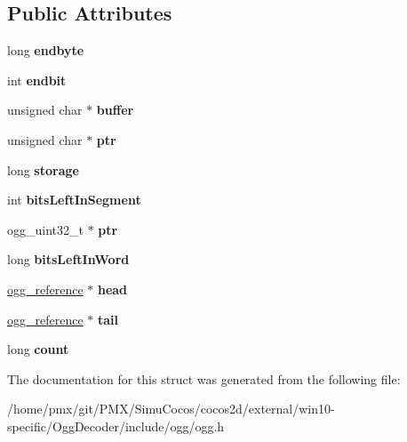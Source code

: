 \subsection*{Public Attributes}
\begin{DoxyCompactItemize}
\item 
\mbox{\label{structoggpack__buffer_a416200dd77da3603dce3913826d74207}} 
long {\bfseries endbyte}
\item 
\mbox{\label{structoggpack__buffer_a5a2ecb260025f73201e58dbd621c9f8b}} 
int {\bfseries endbit}
\item 
\mbox{\label{structoggpack__buffer_aea4c2d57891d2baf710d3ae6d0bf0d57}} 
unsigned char $\ast$ {\bfseries buffer}
\item 
\mbox{\label{structoggpack__buffer_aeea0f14b14eadc508b47e9da1dcc7a32}} 
unsigned char $\ast$ {\bfseries ptr}
\item 
\mbox{\label{structoggpack__buffer_a1eea2afb662c8080a902d224773fee4e}} 
long {\bfseries storage}
\item 
\mbox{\label{structoggpack__buffer_a5193645cd79e66468638a3a9a17a5a40}} 
int {\bfseries bits\+Left\+In\+Segment}
\item 
\mbox{\label{structoggpack__buffer_ae20355287b7df5d4acdd002449ff2baa}} 
ogg\+\_\+uint32\+\_\+t $\ast$ {\bfseries ptr}
\item 
\mbox{\label{structoggpack__buffer_af01c0101b21810a750b965a5b94bd67d}} 
long {\bfseries bits\+Left\+In\+Word}
\item 
\mbox{\label{structoggpack__buffer_ab64fb642435dc4b420259c6155076f54}} 
\hyperlink{structogg__reference}{ogg\+\_\+reference} $\ast$ {\bfseries head}
\item 
\mbox{\label{structoggpack__buffer_a196cfb63a42a9b7bdb1b779ee9bcc59e}} 
\hyperlink{structogg__reference}{ogg\+\_\+reference} $\ast$ {\bfseries tail}
\item 
\mbox{\label{structoggpack__buffer_a16703cfe279425bb2963ff3132b8ed9e}} 
long {\bfseries count}
\end{DoxyCompactItemize}


The documentation for this struct was generated from the following file\+:\begin{DoxyCompactItemize}
\item 
/home/pmx/git/\+P\+M\+X/\+Simu\+Cocos/cocos2d/external/win10-\/specific/\+Ogg\+Decoder/include/ogg/ogg.\+h\end{DoxyCompactItemize}
